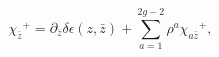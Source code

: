 \begin{equation}
{\chi_{\bar z}}^+ = \partial_{\bar z}\delta \epsilon(z,\bar z) +
\sum_{a=1}^{2g-2} \rho^a {\chi_{a\bar z}}^+, \label{eqrho}
\end{equation}

